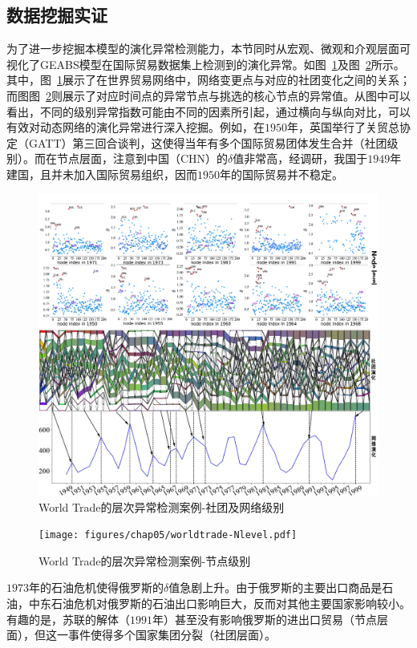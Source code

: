 \subsection{数据挖掘实证}

为了进一步挖掘本模型的演化异常检测能力，本节同时从宏观、微观和介观层面可视化了GEABS模型在国际贸易数据集上检测到的演化异常。如图~\ref{fig:worldtradecaseCN}及图~\ref{fig:worldtradecaseN}所示。其中，图~\ref{fig:worldtradecaseCN}展示了在世界贸易网络中，网络变更点与对应的社团变化之间的关系；而图图~\ref{fig:worldtradecaseN}则展示了对应时间点的异常节点与挑选的核心节点的异常值。从图中可以看出，不同的级别异常指数可能由不同的因素所引起，通过横向与纵向对比，可以有效对动态网络的演化异常进行深入挖掘。例如，在$1950$年，英国举行了关贸总协定（GATT）第三回合谈判，这使得当年有多个国际贸易团体发生合并（社团级别）。而在节点层面，注意到中国（CHN）的$\delta$值非常高，经调研，我国于$1949$年建国，且并未加入国际贸易组织，因而$1950$年的国际贸易并不稳定。

\begin{figure}
	\centering
	\includegraphics[width=\textwidth]{figures/chap05/worldtrade-CNlevel.pdf}
	\caption{World Trade的层次异常检测案例-社团及网络级别}
	\label{fig:worldtradecaseCN}
	\vspace{-2cm}
\end{figure}

\begin{figure}
	\centering
	\texttt{[image: figures/chap05/worldtrade-Nlevel.pdf]}
	\caption{World Trade的层次异常检测案例-节点级别}
	\label{fig:worldtradecaseN}
\end{figure}
$1973$年的石油危机使得俄罗斯的$\delta$值急剧上升。由于俄罗斯的主要出口商品是石油，中东石油危机对俄罗斯的石油出口影响巨大，反而对其他主要国家影响较小。有趣的是，苏联的解体（$1991$年）甚至没有影响俄罗斯的进出口贸易（节点层面），但这一事件使得多个国家集团分裂（社团层面）。

